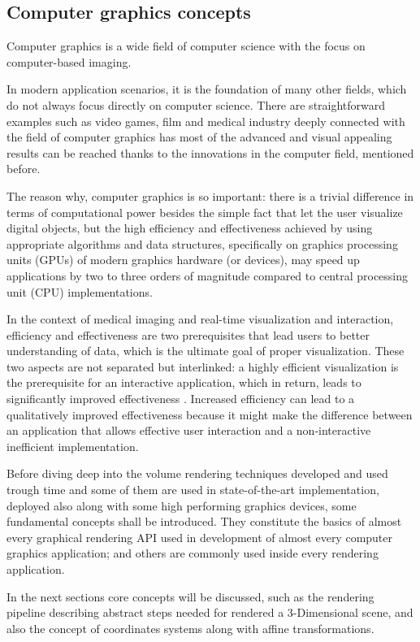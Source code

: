 \documentclass[12pt,a4paper]{extarticle}
\newcommand{\linespace}{\vspace{0pt}}
\begin{document}
\subsection{Computer graphics concepts} 
Computer graphics is a wide field of computer science with the focus on computer-based imaging.

In modern application scenarios, it is the foundation of many other fields, which do not always focus directly on computer science. There are straightforward examples such as video games, film and medical industry deeply connected with the field of computer graphics has most of the advanced and visual appealing results can be reached thanks to the innovations in the computer field, mentioned before.

The reason why, computer graphics is so important: there is a trivial difference in terms of computational power besides the simple fact that let the user visualize digital objects, but the high efficiency and effectiveness achieved by using appropriate algorithms and data structures, specifically on graphics processing units (GPUs) of modern graphics hardware (or devices), may speed up applications by two to three orders of magnitude compared to central processing unit (CPU) implementations.
\linespace

In the context of medical imaging and real-time visualization and interaction, efficiency and effectiveness are two prerequisites that lead users to better understanding of data, which is the ultimate goal of proper visualization.
These two aspects are not separated but interlinked: a highly efficient visualization is the prerequisite for an interactive application, which in return, leads to significantly improved effectiveness \cite{weiskopf_2006:1}.
Increased efficiency can lead to a qualitatively improved effectiveness because it might make the difference between an application that allows effective user interaction and a non-interactive inefficient implementation.
\linespace

Before diving deep into the volume rendering techniques developed and used trough time and some of them are  used in state-of-the-art implementation, deployed also along with some high performing graphics devices, some fundamental concepts shall be introduced. They constitute the basics of almost every graphical rendering API used in development of almost every computer graphics application; and others are commonly used inside every rendering application.


In the next sections core concepts will be discussed, such as the rendering pipeline describing abstract steps needed for rendered a 3-Dimensional scene, and also the concept of coordinates systems along with affine transformations. 
\end{document}
